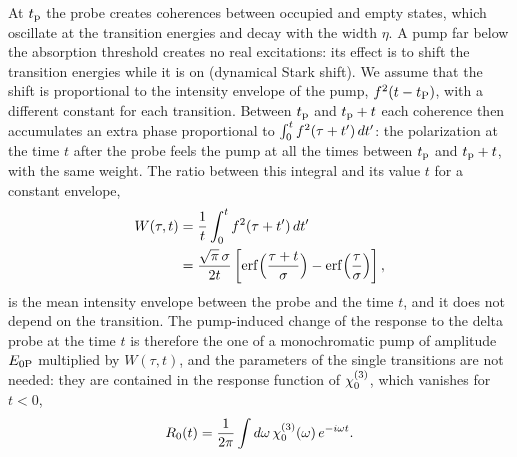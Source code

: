 \documentclass[aps,prb,reprint,superscriptaddress,amsmath,amssymb]{revtex4-2}
\begin{document}
At $t_{\mathrm{p}}$ the probe creates coherences between occupied and empty states, which oscillate at the transition energies
and decay with the width $\eta$. A pump far below the absorption threshold creates no real excitations: its effect is
to shift the transition energies while it is on (dynamical Stark shift). We assume that the shift is proportional to
the intensity envelope of the pump, $f^2(t-t_{\mathrm{P}})$, with a different constant for each transition. Between $t_{\mathrm{p}}$ and
$t_{\mathrm{p}}+t$ each coherence then accumulates an extra phase proportional to $\int_0^tf^2(\tau+t')\,dt'$: the
polarization at the time $t$ after the probe feels the pump at all the times between $t_{\mathrm{p}}$ and $t_{\mathrm{p}}+t$, with the same
weight. The ratio between this integral and its value $t$ for a constant envelope,
\begin{align}
W(\tau,t) &= \frac{1}{t}\int_0^tf^2(\tau+t')\,dt' \nonumber\\
&= \frac{\sqrt{\pi}\,\sigma}{2t}\left[\mathrm{erf}\Big(\frac{\tau+t}{\sigma}\Big)
-\mathrm{erf}\Big(\frac{\tau}{\sigma}\Big)\right] ,
\label{eq:W}
\end{align}
is the mean intensity envelope between the probe and the time $t$, and it does not depend on the transition. The
pump-induced change of the response to the delta probe at the time $t$ is therefore the one of a monochromatic pump of
amplitude $E_{0\mathrm{P}}$ multiplied by $W(\tau,t)$, and the parameters of the single transitions are not needed: they are
contained in the response function of $\chi^{(3)}_{0}$, which vanishes for $t<0$,
\begin{equation}
R_0(t) = \frac{1}{2\pi}\int d\omega\,\chi^{(3)}_{0}(\omega)\,e^{-i\omega t} .
\label{eq:R0}
\end{equation}
\end{document}
